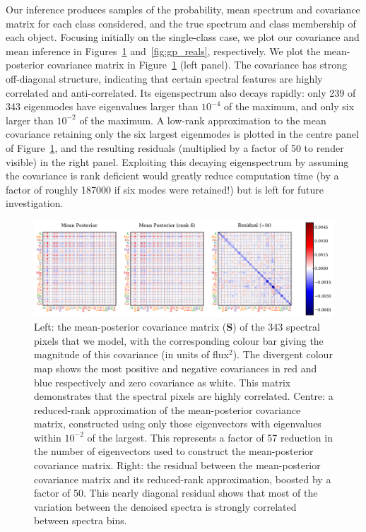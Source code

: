 \documentclass[a4paper,fleqn,usenatbib]{mnras}
\newcommand{\speccov}{{\bm S}}
\begin{document}
Our inference produces samples of the probability, mean spectrum and covariance matrix for each class considered, and the true spectrum and class membership of each object. Focusing initially on the single-class case, we plot our covariance and mean inference in Figures~\ref{fig:inferred_cov} and~\ref{fig:gp_reals}, respectively. We plot the mean-posterior covariance matrix in Figure~\ref{fig:inferred_cov} (left panel). The covariance has strong off-diagonal structure, indicating that certain spectral features are highly correlated and anti-correlated. Its eigenspectrum also decays rapidly: only 239 of 343 eigenmodes have eigenvalues larger than $10^{-4}$ of the maximum, and only six larger than $10^{-2}$ of the maximum. A low-rank approximation to the mean covariance retaining only the six largest eigenmodes is plotted in the centre panel of Figure~\ref{fig:inferred_cov}, and the resulting residuals (multiplied by a factor of 50 to render visible) in the right panel. Exploiting this decaying eigenspectrum by assuming the covariance is rank deficient would greatly reduce computation time (by a factor of roughly 187000 if six modes were retained!) but is left for future investigation.

\begin{figure}
	\includegraphics[width=2\columnwidth]{apogee_centers_final_29502_spc_iw_prior_win_wid_1p5_very_low_rank_covariance.pdf}
    \caption{Left: the mean-posterior covariance matrix ($\speccov$) of the 343 spectral pixels that we model, with the corresponding colour bar giving the magnitude of this covariance (in units of flux$^2$). The divergent colour map shows the most positive and negative covariances in red and blue respectively and zero covariance as white. This matrix demonstrates that the spectral pixels are highly correlated. Centre: a reduced-rank approximation of the mean-posterior covariance matrix, constructed using only those eigenvectors with eigenvalues within $10^{-2}$ of the largest. This represents a factor of 57 reduction in the number of eigenvectors used to construct the mean-posterior covariance matrix. Right: the residual between the mean-posterior covariance matrix and its reduced-rank approximation, boosted by a factor of 50. This nearly diagonal residual shows that most of the variation between the denoised spectra is strongly correlated between spectra bins.}
    \label{fig:inferred_cov}
\end{figure}
\end{document}
